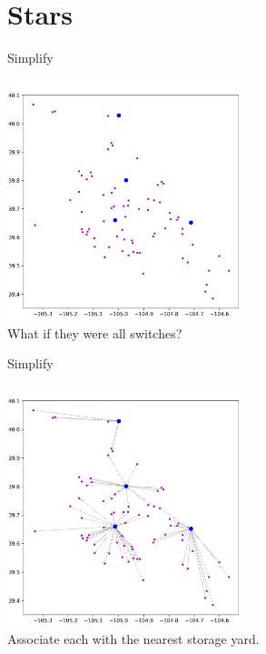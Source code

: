 \documentclass{beamer}
\begin{document}
\section{Stars}
\begin{frame}{Simplify}
	\begin{center}
	\includegraphics[width=7cm]{all_switch.png}\\
	What if they were all switches?
	\end{center}
\end{frame}

\begin{frame}{Simplify}
	\begin{center}
	\includegraphics[width=7cm]{all_switch_star.png}\\
	Associate each with the nearest storage yard.
	\end{center}
\end{frame}
\end{document}
